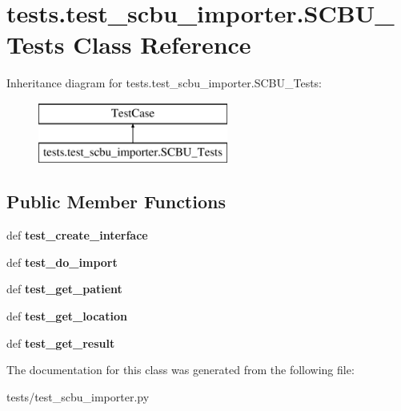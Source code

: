 \hypertarget{classtests_1_1test__scbu__importer_1_1_s_c_b_u___tests}{\section{tests.\-test\-\_\-scbu\-\_\-importer.\-S\-C\-B\-U\-\_\-\-Tests Class Reference}
\label{classtests_1_1test__scbu__importer_1_1_s_c_b_u___tests}
}
Inheritance diagram for tests.\-test\-\_\-scbu\-\_\-importer.\-S\-C\-B\-U\-\_\-\-Tests\-:\begin{figure}[H]
\begin{center}
\leavevmode
\includegraphics[height=2.000000cm]{classtests_1_1test__scbu__importer_1_1_s_c_b_u___tests}
\end{center}
\end{figure}
\subsection*{Public Member Functions}
\begin{DoxyCompactItemize}
\item 
\hypertarget{classtests_1_1test__scbu__importer_1_1_s_c_b_u___tests_ab8af92926a6380a42bb7ab9134a285aa}{def {\bfseries test\-\_\-create\-\_\-interface}}\label{classtests_1_1test__scbu__importer_1_1_s_c_b_u___tests_ab8af92926a6380a42bb7ab9134a285aa}

\item 
\hypertarget{classtests_1_1test__scbu__importer_1_1_s_c_b_u___tests_a4c19309db2aa8dfb7729b88931cd593a}{def {\bfseries test\-\_\-do\-\_\-import}}\label{classtests_1_1test__scbu__importer_1_1_s_c_b_u___tests_a4c19309db2aa8dfb7729b88931cd593a}

\item 
\hypertarget{classtests_1_1test__scbu__importer_1_1_s_c_b_u___tests_a1153264d145476558e4b319df768cdf6}{def {\bfseries test\-\_\-get\-\_\-patient}}\label{classtests_1_1test__scbu__importer_1_1_s_c_b_u___tests_a1153264d145476558e4b319df768cdf6}

\item 
\hypertarget{classtests_1_1test__scbu__importer_1_1_s_c_b_u___tests_afa4bb0e1b134dc1f007c789574e78493}{def {\bfseries test\-\_\-get\-\_\-location}}\label{classtests_1_1test__scbu__importer_1_1_s_c_b_u___tests_afa4bb0e1b134dc1f007c789574e78493}

\item 
\hypertarget{classtests_1_1test__scbu__importer_1_1_s_c_b_u___tests_ad1050524ac28f979e7a76788fd846424}{def {\bfseries test\-\_\-get\-\_\-result}}\label{classtests_1_1test__scbu__importer_1_1_s_c_b_u___tests_ad1050524ac28f979e7a76788fd846424}

\end{DoxyCompactItemize}


The documentation for this class was generated from the following file\-:\begin{DoxyCompactItemize}
\item 
tests/test\-\_\-scbu\-\_\-importer.\-py\end{DoxyCompactItemize}
